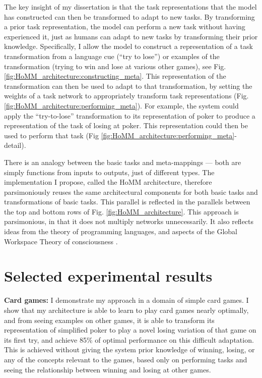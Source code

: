 \documentclass[12pt]{article}
\begin{document}
The key insight of my dissertation is that the task representations that the model has constructed can then be transformed to adapt to new tasks. By transforming a prior task representation, the model can perform a new task without having experienced it, just as humans can adapt to new tasks by transforming their prior knowledge. Specifically, I allow the model to construct a representation of a task transformation from a language cue (``try to lose'') or examples of the transformation (trying to win and lose at various other games), see Fig. \ref{fig:HoMM_architecture:constructing_meta}. This representation of the transformation can then be used to adapt to that transformation, by setting the weights of a task network to appropriately transform task representations (Fig. \ref{fig:HoMM_architecture:performing_meta}). For example, the system could apply the ``try-to-lose'' transformation to its representation of poker to produce a representation of the task of losing at poker. This representation could then be used to perform that task (Fig \ref{fig:HoMM_architecture:performing_meta}-detail). 

There is an analogy between the basic tasks and meta-mappings --- both are simply functions from inputs to outputs, just of different types. The implementation I propose, called the HoMM architecture, therefore parsimoniously reuses the same architectural components for both basic tasks and transformations of basic tasks. This parallel is reflected in the parallels between the top and bottom rows of Fig. \ref{fig:HoMM_architecture}. This approach is parsimonious, in that it does not multiply networks unnecessarily. It also reflects ideas from the theory of programming languages, and aspects of the Global Workspace Theory of consciousness \citep{Baars2005}. 

\section{Selected experimental results}
\textbf{Card games:} I demonstrate my approach in a domain of simple card games. I show that my architecture is able to learn to play card games nearly optimally, and from seeing examples on other games, it is able to transform its representation of simplified poker to play a novel losing variation of that game on its first try, and achieve 85\% of optimal performance on this difficult adaptation. This is achieved without giving the system prior knowledge of winning, losing, or any of the concepts relevant to the games, based only on performing tasks and seeing the relationship between winning and losing at other games.
\end{document}
